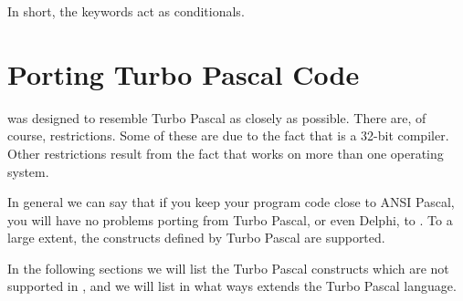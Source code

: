 \documentclass{report}
\begin{document}
In short, the  keywords act as conditionals.



\chapter{Porting Turbo Pascal Code}

\fpk was designed to resemble Turbo Pascal as closely as possible. There
are, of course, restrictions. Some of these are due to the fact that \fpk is
a 32-bit compiler. Other restrictions result from the fact that \fpk works
on more than one operating system.

In general we can say that if you keep your program code close to ANSI
Pascal, you will have no problems porting from Turbo Pascal, or even Delphi, to
\fpk. To a large extent, the constructs defined by Turbo Pascal are
supported.

In the following sections we will list the Turbo Pascal constructs which are
not supported in \fpk, and we will list in what ways \fpk extends the Turbo
Pascal language.


\end{document}

